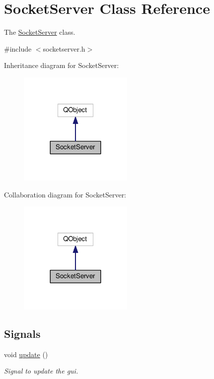 \hypertarget{classSocketServer}{}\section{Socket\+Server Class Reference}
\label{classSocketServer}


The \hyperlink{classSocketServer}{Socket\+Server} class.  




{\ttfamily \#include $<$socketserver.\+h$>$}



Inheritance diagram for Socket\+Server\+:
\nopagebreak
\begin{figure}[H]
\begin{center}
\leavevmode
\includegraphics[width=156pt]{classSocketServer__inherit__graph}
\end{center}
\end{figure}


Collaboration diagram for Socket\+Server\+:
\nopagebreak
\begin{figure}[H]
\begin{center}
\leavevmode
\includegraphics[width=156pt]{classSocketServer__coll__graph}
\end{center}
\end{figure}
\subsection*{Signals}
\begin{DoxyCompactItemize}
\item 
void \hyperlink{classSocketServer_a59d8051aa46795d73bd112afaa850f37}{update} ()\hypertarget{classSocketServer_a59d8051aa46795d73bd112afaa850f37}{}\label{classSocketServer_a59d8051aa46795d73bd112afaa850f37}

\begin{DoxyCompactList}\small\item\em Signal to update the gui. \end{DoxyCompactList}\end{DoxyCompactItemize}
